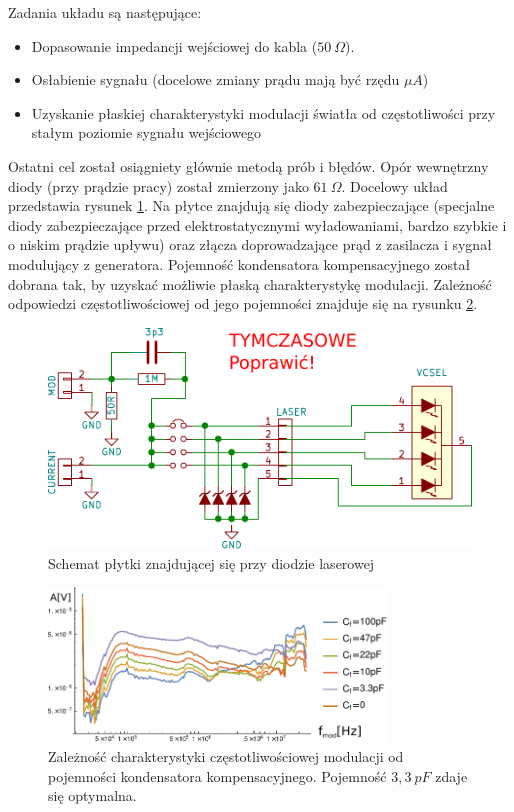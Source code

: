\documentclass[a4paper,10pt]{article}
\begin{document}
Zadania układu są następujące:
\begin{itemize}
 \item Dopasowanie impedancji wejściowej do kabla ($50~\Omega$).
 \item Osłabienie sygnału (docelowe zmiany prądu mają być rzędu $\mu A$)
 \item Uzyskanie płaskiej charakterystyki modulacji światła od częstotliwości przy stałym poziomie sygnału wejściowego
\end{itemize}

Ostatni cel został osiągniety głównie metodą prób i błędów. Opór wewnętrzny diody (przy prądzie pracy) został zmierzony jako $61~ \Omega$.
Docelowy układ przedstawia rysunek \ref{sch-mod}. Na płytce znajdują się diody zabezpieczające (specjalne diody zabezpieczające przed elektrostatycznymi wyładowaniami, bardzo szybkie i o niskim prądzie upływu) oraz złącza doprowadzające prąd z zasilacza i sygnał modulujący z generatora. Pojemność kondensatora kompensacyjnego został dobrana tak, by uzyskać możliwie płaską charakterystykę modulacji. Zależność odpowiedzi częstotliwościowej od jego pojemności znajduje się na rysunku \ref{wyk-mod}.

\begin{figure}
\begin{center}
 \includegraphics{./obrazki/dings.pdf}
\end{center}
\caption{Schemat płytki znajdującej się przy diodzie laserowej}
\label{sch-mod}
\end{figure}

\begin{figure}
\begin{center}
 \includegraphics[width=0.8\textwidth]{./obrazki/bw.pdf}
\end{center}
\caption{Zależność charakterystyki częstotliwościowej modulacji od pojemności kondensatora kompensacyjnego. Pojemność $3{,}3~pF$ zdaje się optymalna.}
\label{wyk-mod}
\end{figure}
\end{document}
